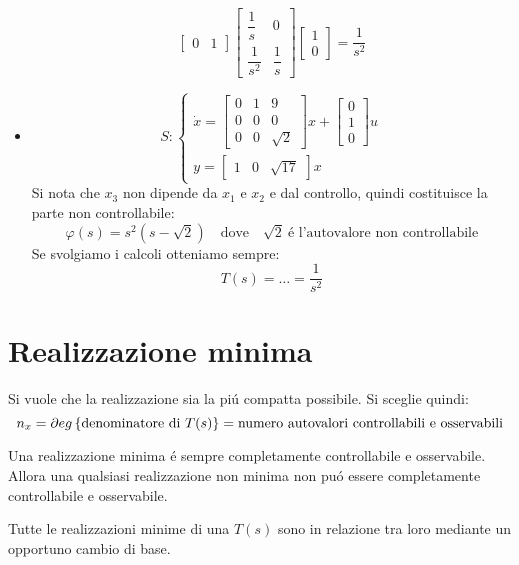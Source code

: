 \documentclass[../main.tex]{subfiles}
\begin{document}
\begin{itemize}
				\[
					\begin{bmatrix}
						0 & 1
					\end{bmatrix}
					\begin{bmatrix}
						\dfrac{1}{s} & 0\\[.5cm]
						\dfrac{1}{s^2} & \dfrac{1}{s}
					\end{bmatrix}
					\begin{bmatrix}
						1\\
						0
					\end{bmatrix} = \dfrac{1}{s^2}
				\]
			\item 
				\[
					S:
					\begin{cases}
						\dot x =
						\begin{bmatrix}
							0 & 1 & 9\\
							0 & 0 & 0\\
							0 & 0 & \sqrt{2}
						\end{bmatrix} x+
						\begin{bmatrix}
							0\\
							1\\
							0
						\end{bmatrix} u
						\\
						y =
						\begin{bmatrix}
							1 & 0 & \sqrt{17}
						\end{bmatrix} x
					\end{cases}
				\]
				Si nota che $ x_3 $ non dipende da $ x_1 $ e $ x_2 $ e dal controllo, quindi costituisce la parte non controllabile:
				\[
					\varphi(s) = s^2(s-\sqrt{2}) \quad\text{dove}\quad \sqrt{2} \ \text{\'e l'autovalore non controllabile}
				\]
				Se svolgiamo i calcoli otteniamo sempre:
				\[
					T(s) = \dots = \dfrac{1}{s^2}
				\]
		\end{itemize}
	
	\section{Realizzazione minima}
		Si vuole che la realizzazione sia la pi\'u compatta possibile. Si sceglie quindi:
		\[
			n_x = \partial eg \left\lbrace \text{denominatore di}\ T(s) \right\rbrace = \text{numero autovalori controllabili e osservabili}
		\]
		
		Una realizzazione minima \'e sempre completamente controllabile e osservabile. Allora una qualsiasi realizzazione non minima non pu\'o essere completamente controllabile e osservabile.
		
		Tutte le realizzazioni minime di una $ T(s) $ sono in relazione tra loro mediante un opportuno cambio di base.
		
\end{document}
